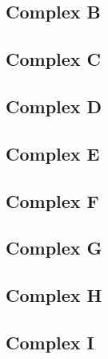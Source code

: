 \documentclass[../../course]{subfiles}
\begin{document}
\subsection{Complex B}
\subsection{Complex C}
\subsection{Complex D}
\subsection{Complex E}
\subsection{Complex F}
\subsection{Complex G}
\subsection{Complex H}
\subsection{Complex I}


\end{document}

